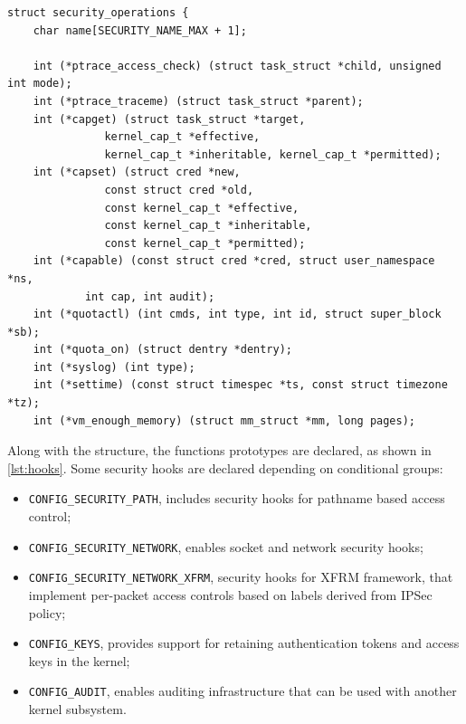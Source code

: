 \begin{lstlisting}[style=CInputStyle, caption=Security structure declaration (Linux kernel v3.11), label=lst:struct_ops]
struct security_operations {
	char name[SECURITY_NAME_MAX + 1];

	int (*ptrace_access_check) (struct task_struct *child, unsigned int mode);
	int (*ptrace_traceme) (struct task_struct *parent);
	int (*capget) (struct task_struct *target,
		       kernel_cap_t *effective,
		       kernel_cap_t *inheritable, kernel_cap_t *permitted);
	int (*capset) (struct cred *new,
		       const struct cred *old,
		       const kernel_cap_t *effective,
		       const kernel_cap_t *inheritable,
		       const kernel_cap_t *permitted);
	int (*capable) (const struct cred *cred, struct user_namespace *ns,
			int cap, int audit);
	int (*quotactl) (int cmds, int type, int id, struct super_block *sb);
	int (*quota_on) (struct dentry *dentry);
	int (*syslog) (int type);
	int (*settime) (const struct timespec *ts, const struct timezone *tz);
	int (*vm_enough_memory) (struct mm_struct *mm, long pages);
\end{lstlisting}

Along with the structure, the functions prototypes are declared, as shown in \autoref{lst:hooks}. Some security hooks are declared depending on conditional groups:

\begin{itemize}
 \item \texttt{CONFIG\_SECURITY\_PATH}, includes security hooks for pathname based access control;
 \item \texttt{CONFIG\_SECURITY\_NETWORK}, enables socket and network security hooks;
 \item \texttt{CONFIG\_SECURITY\_NETWORK\_XFRM}, security hooks for XFRM framework, that implement per-packet access controls based on labels derived from IPSec policy;
\item \texttt{CONFIG\_KEYS}, provides support for retaining authentication tokens and access keys in the kernel;
\item \texttt{CONFIG\_AUDIT}, enables auditing infrastructure that can be used with another kernel subsystem.
\end{itemize}

